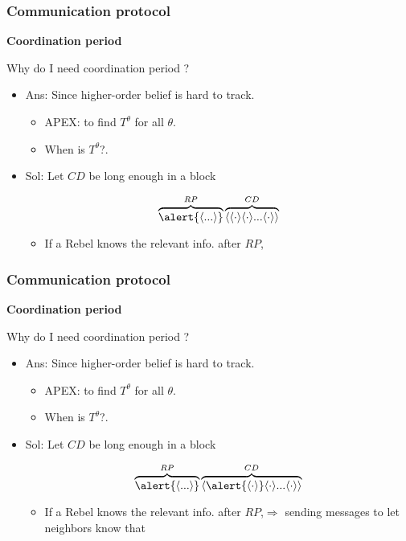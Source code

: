 \documentclass[10pt]{beamer}
\begin{document}
\begin{frame}
  \frametitle{Communication protocol}

\textbf{Coordination period}

Why do I need coordination period ?
\begin{itemize}
\item Ans: Since higher-order belief is hard to track.

\begin{itemize}
\item APEX: to find $T^{\theta}$ for all $\theta$.
\item When is $T^{\theta}$?.
\end{itemize}
\item Sol: Let $CD$ be long enough in a block

\[\overbrace{\alert{\langle ... \rangle}}^{RP}\overbrace{\langle \langle \cdot \rangle \langle \cdot \rangle...\langle \cdot \rangle\rangle}^{CD}\] 
\begin{itemize}
\item If a Rebel knows the relevant info. after $RP$, 
\end{itemize}

\end{itemize}

\end{frame}




\begin{frame}
  \frametitle{Communication protocol}

\textbf{Coordination period}

Why do I need coordination period ?
\begin{itemize}
\item Ans: Since higher-order belief is hard to track.

\begin{itemize}
\item APEX: to find $T^{\theta}$ for all $\theta$.
\item When is $T^{\theta}$?.
\end{itemize}
\item Sol: Let $CD$ be long enough in a block

\[\overbrace{\alert{\langle ... \rangle}}^{RP}\overbrace{\langle \alert{\langle \cdot \rangle} \langle \cdot \rangle...\langle \cdot \rangle\rangle}^{CD}\] 
\begin{itemize}
\item If a Rebel knows the relevant info. after $RP$,$\Rightarrow$ sending messages to let neighbors know that 
\end{itemize}

\end{itemize}

\end{frame}
\end{document}
